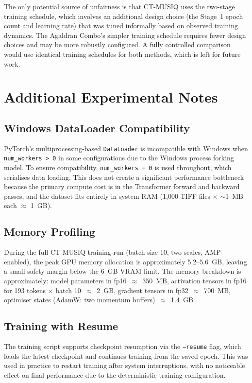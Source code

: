 The only potential source of unfairness is that CT-MUSIQ uses the two-stage training
schedule, which involves an additional design choice (the Stage~1 epoch count and
learning rate) that was tuned informally based on observed training dynamics. The
Agaldran Combo's simpler training schedule requires fewer design choices and may be
more robustly configured. A fully controlled comparison would use identical training
schedules for both methods, which is left for future work.

\section{Additional Experimental Notes}

\subsection{Windows DataLoader Compatibility}

PyTorch's multiprocessing-based \texttt{DataLoader} is incompatible with Windows when
\texttt{num\_workers > 0} in some configurations due to the Windows process forking
model. To ensure compatibility, \texttt{num\_workers = 0} is used throughout, which
serialises data loading. This does not create a significant performance bottleneck
because the primary compute cost is in the Transformer forward and backward passes, and
the dataset fits entirely in system RAM (1,000 TIFF files $\times$ $\sim$1~MB each
$\approx$ 1~GB).

\subsection{Memory Profiling}

During the full CT-MUSIQ training run (batch size 10, two scales, AMP enabled), the
peak GPU memory allocation is approximately 5.2--5.6~GB, leaving a small safety margin
below the 6~GB VRAM limit. The memory breakdown is approximately: model parameters
in fp16~$\approx$~350~MB, activation tensors in fp16 for 193 tokens × batch
10~$\approx$~2~GB, gradient tensors in fp32~$\approx$~700~MB, optimiser states
(AdamW: two momentum buffers)~$\approx$~1.4~GB.

\subsection{Training with Resume}

The training script supports checkpoint resumption via the \texttt{--resume} flag,
which loads the latest checkpoint and continues training from the saved epoch. This
was used in practice to restart training after system interruptions, with no noticeable
effect on final performance due to the deterministic training configuration.

